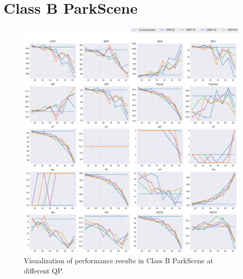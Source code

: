 
\section{Class B ParkScene}
\label{sec:appendix/ParkScene_all}


\begin{figure}[!htbp]
\centering
\includegraphics[width=1.0\linewidth]{img/appendix/ParkScene_all_multiplots_qp.pdf}
\caption[Visualization of performance results in Class B ParkScene at different QP]
{Visualization of performance results in Class B ParkScene at different QP.}
\label{fig:ParkScene_all_qp}
\end{figure}

